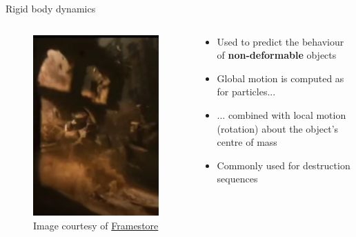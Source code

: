 \begin{frame}{Rigid body dynamics}
	\begin{columns}
		\begin{column}{0.3\textwidth}
			\begin{figure}
				\includegraphics[width=\textwidth]{rigid_bodies}
				\caption*{Image courtesy of \href{https://www.framestore.com}{Framestore}}
			\end{figure}
		\end{column}
		\begin{column}{0.65\textwidth}
			\begin{itemize}
				\pause\item Used to predict the behaviour of \textbf{non-deformable} objects
				\pause\item Global motion is computed as for particles...
				\pause\item ... combined with local motion (rotation) about the object's centre of mass
				\pause\item Commonly used for destruction sequences
			\end{itemize}
		\end{column}
	\end{columns}
\end{frame}

